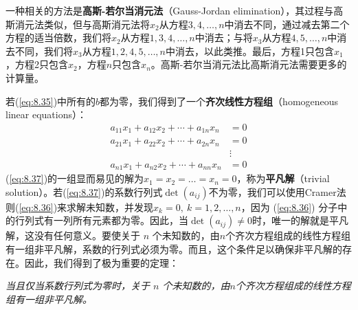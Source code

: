     一种相关的方法是\textbf{高斯-若尔当消元法}（Gauss-Jordan elimination），其过程与高斯消元法类似，但与高斯消元法将$x_2$从方程$3,4,\ldots,n$中消去不同，通过减去第二个方程的适当倍数，我们将$x_2$从方程$1,3,4,\ldots,n$中消去；与将$x_3$从方程$4,5,\ldots,n$中消去不同，我们将$x_3$从方程$1,2,4,5,\ldots,n$中消去，以此类推。最后，方程1只包含$x_1$，方程2只包含$x_2$，方程$n$只包含$x_n$。高斯-若尔当消元法比高斯消元法需要更多的计算量。

    若(\ref{eq:8.35})中所有的$b$都为零，我们得到了一个\textbf{齐次线性方程组}（homogeneous linear equations）：
    \begin{equation}
        \begin{aligned}
            a_{11}x_1 + a_{12}x_2 + \cdots + a_{1n}x_n &= 0 \\
            a_{21}x_1 + a_{22}x_2 + \cdots + a_{2n}x_n &= 0 \\
            &\vdots \\
            a_{n1}x_1 + a_{n2}x_2 + \cdots + a_{nn}x_n &= 0
        \end{aligned}
        \label{eq:8.37}
    \end{equation}
    (\ref{eq:8.37})的一组显而易见的解为$x_1=x_2 = \ldots = x_n=0$，称为\textbf{平凡解}（trivial solution）。若(\ref{eq:8.37})的系数行列式$\det\left(a_{ij}\right)$不为零，我们可以使用Cramer法则(\ref{eq:8.36})来求解未知数，并发现$x_k=0, \: k=1,2,\ldots,n$，因为 (\ref{eq:8.36}) 分子中的行列式有一列所有元素都为零。因此，当$\det\left(a_{ij}\right) \neq 0$时，唯一的解就是平凡解，这没有任何意义。要使关于 $n$ 个未知数的，由$n$个齐次方程组成的线性方程组有一组非平凡解，系数的行列式必须为零。而且，这个条件足以确保非平凡解的存在。因此，我们得到了极为重要的定理：
    \begin{center}
        \parbox{0.8\textwidth}{
            \textit{当且仅当系数行列式为零时，关于 $n$ 个未知数的，由$n$个齐次方程组成的线性方程组有一组非平凡解。}
        }
    \end{center}

